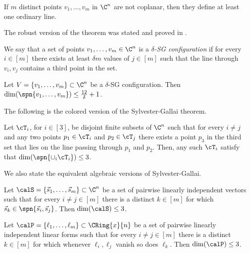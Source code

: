 \begin{theorem}\label{thm:Kelly}
If $m$ distinct points $v_1,\ldots ,v_m$ in $\C^n$ are not coplanar, then they define at least one ordinary line.
\end{theorem}

The robust version of the theorem was stated and proved in \cite{barak2013fractional,DSW12}.
\begin{definition}\label{def:delta-SGConf}
We say that a set of points $v_1,\ldots ,v_m\in \C^n$ is a \textit{$\delta$-SG configuration} if for every $i\in [m]$ there exists at least $\delta m$ values of $j \in [m]$ such that the line through $v_i,v_j$ contains a third point in the set.
\end{definition}

\begin{theorem}\label{thm:robustSG}
Let $V = \lbrace v_1,\ldots ,v_m\rbrace \subset \C^n$ be a $\delta$-SG configuration. Then $\dim(\spn{v_1,\ldots ,v_m}) \leq \frac{12}{\delta}+1$.
\end{theorem}

The following is the colored version of the Sylvester-Gallai theorem.

\begin{theorem}\label{thm:EK}
Let $\cT_i$, for $i\in [3]$, be disjoint finite subsets of $\C^n$ such that for every $i\neq j$ and any two points $p_1\in \cT_i$ and $p_2 \in \cT_j$ there exists a point $p_3$ in the third set that lies on the line passing through $p_1$ and $p_2$. Then, any such $\cT_i$ satisfy that $\dim(\spn{\cup_i \cT_i})\leq 3$.
\end{theorem}

We also state the equivalent algebraic versions of Sylvester-Gallai.

\begin{theorem}\label{thm:SGVec}
Let $\calS = \lbrace \vec{s}_1,\ldots ,\vec{s}_m\rbrace \subset \C^n$ be a set of pairwise linearly independent vectors such that for every $i\neq j\in [m]$ there is a distinct $k \in [m]$ for which $\vec{s}_k \in \spn{\vec{s}_i,\vec{s}_j}$. Then $\dim(\calS) \leq 3$.
\end{theorem}


\begin{theorem}\label{thm:SG-linforms}
Let $\calP = \lbrace \ell_1,\ldots ,\ell_m\rbrace \subset \CRing{x}{n}$ be a set of pairwise linearly independent linear forms such that for every $i\neq j\in [m]$ there is a distinct $k \in [m]$ for which whenever $\ell_i, \ell_j$ vanish so does $\ell_k$. Then $\dim(\calP) \leq 3$.
\end{theorem}

